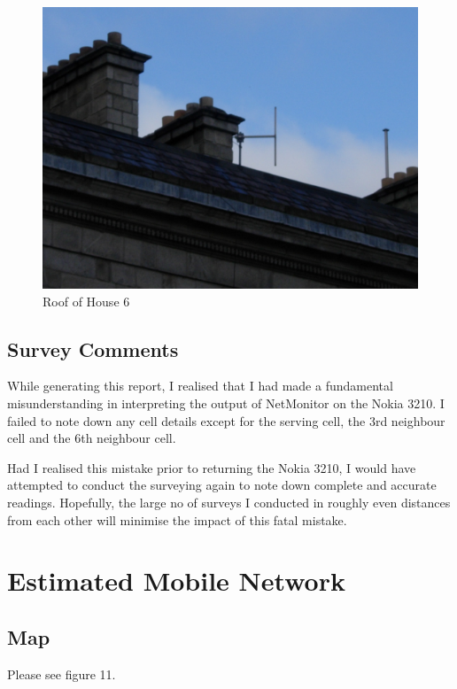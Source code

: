 \documentclass[a4paper,12pt]{article}
\begin{document}
\begin{figure}[h]

\includegraphics{12.png}

\caption{Roof of House 6}

\end{figure}

\subsection{Survey Comments}

While generating this report, I realised that I had made a fundamental
misunderstanding in interpreting the output of NetMonitor on the Nokia
3210. I failed to note down any cell details except for the serving
cell, the 3rd neighbour cell and the 6th neighbour cell. 


Had I realised this mistake prior to returning the Nokia 3210, I would
have attempted to conduct the surveying again to note down complete and
accurate readings. Hopefully, the large no of surveys I conducted in 
roughly even distances from each other will minimise the impact of this 
fatal mistake.

\section{Estimated Mobile Network}

\subsection{Map}

Please see figure 11.
\end{document}

